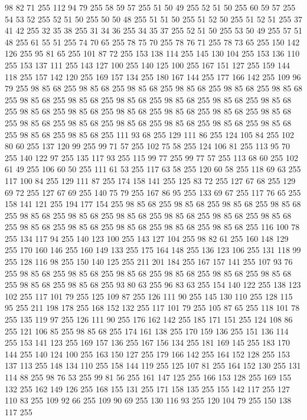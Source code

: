 98 82 71 255 112 94 79 255 58 59 57 255 51 50 49 255 52 51 50 255 60 59 57 255 54 53 52 255 52 51 50 255 50 50 48 255 51 51 50 255 51 52 50 255 51 52 51 255 37 41 42 255 32 35 38 255 31 34 36 255 34 35 37 255 52 51 50 255 53 50 49 255 57 51 48 255 61 55 51 255 74 70 65 255 78 75 70 255 78 76 71 255 78 73 65 255 150 142 126 255 95 81 65 255 101 87 72 255 153 138 114 255 145 130 104 255 153 136 110 255 153 137 111 255 143 127 100 255 140 125 100 255 167 151 127 255 159 144 118 255 157 142 120 255 169 157 134 255 180 167 144 255 177 166 142 255 109 96 79 255 98 85 68 255 98 85 68 255 98 85 68 255 98 85 68 255 98 85 68 255 98 85 68 255 98 85 68 255 98 85 68 255 98 85 68 255 98 85 68 255 98 85 68 255 98 85 68 255 98 85 68 255 98 85 68 255 98 85 68 255 98 85 68 255 98 85 68 255 98 85 68 255 98 85 68 255 98 85 68 255 98 85 68 255 98 85 68 255 98 85 68 255 98 85 68 255
98 85 68 255 98 85 68 255 111 93 68 255 129 111 86 255 124 105 84 255 102 80 60 255 137 120 99 255 99 71 57 255 102 75 58 255 124 106 81 255 113 95 70 255 140 122 97 255 135 117 93 255 115 99 77 255 99 77 57 255 113 68 60 255 102 61 49 255 106 60 50 255 111 61 53 255 117 63 58 255 120 60 58 255 118 69 63 255 117 100 84 255 129 111 87 255 174 158 141 255 125 83 72 255 127 67 68 255 129 69 72 255 127 67 69 255 140 75 79 255 167 86 95 255 133 69 67 255 117 76 65 255 158 141 121 255 194 177 154 255 98 85 68 255 98 85 68 255 98 85 68 255 98 85 68 255 98 85 68 255 98 85 68 255 98 85 68 255 98 85 68 255 98 85 68 255 98 85 68 255 98 85 68 255 98 85 68 255 98 85 68 255 98 85 68 255 98 85 68 255 116 100 78 255 134 117 94 255 140 123 100 255 143 127 104 255 98 82 61 255 160 148 129 255 170 160 146 255 160 149 133 255 175 164 148 255 136 123 106 255 131 118 99 255 128 116 98 255 150 140 125 255 211 201 184 255
167 157 141 255 107 93 76 255 98 85 68 255 98 85 68 255 98 85 68 255 98 85 68 255 98 85 68 255 98 85 68 255 98 85 68 255 98 85 68 255 93 80 63 255 96 83 63 255 154 140 122 255 138 123 102 255 117 101 79 255 125 109 87 255 126 111 90 255 145 130 110 255 128 115 95 255 211 198 178 255 168 152 132 255 117 101 79 255 105 87 65 255 118 101 78 255 135 119 97 255 126 111 90 255 176 162 142 255 185 171 151 255 124 108 86 255 121 106 85 255 98 85 68 255 174 161 138 255 170 159 136 255 151 136 114 255 153 141 123 255 169 157 136 255 167 156 134 255 181 169 145 255 183 170 144 255 140 124 100 255 163 150 127 255 179 166 142 255 164 152 128 255 153 137 113 255 148 134 110 255 158 144 119 255 125 107 81 255 164 152 130 255 131 114 88 255 98 76 53 255 99 81 56 255 161 147 125 255 166 153 128 255 169 155 132 255 162 149 126 255 168 155 131 255 171 158 135 255 155 142 117 255 127 110 83 255 109 92 66 255 109 90 69 255 130 116 93 255 120 104 79 255 150 138 117 255
